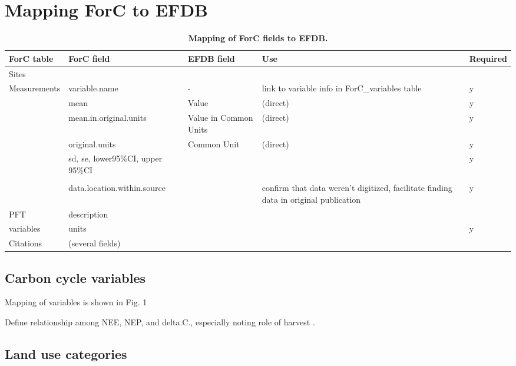 \documentclass[, manuscript]{copernicus}
\begin{document}
\section{Mapping ForC to EFDB}

\begin{table}

\caption{\label{tab:table_ForCfieldmapping}\textbf{Mapping of ForC fields to EFDB.}}
\centering
\begin{tabu} to 
\hline
\textbf{ForC table} & \textbf{ForC field} & \textbf{EFDB field} & \textbf{Use} & \textbf{Required}\\
\hline
Sites &  &  &  & \\
\hline
Measurements & variable.name & - & link to variable info in ForC\_variables table & y\\
\hline
 & mean & Value & (direct) & y\\
\hline
 & mean.in.original.units & Value in Common Units & (direct) & y\\
\hline
 & original.units & Common Unit & (direct) & y\\
\hline
 & sd, se, lower95\%CI, upper 95\%CI &  &  & y\\
\hline
 &  &  &  & \\
\hline
 & data.location.within.source &  & confirm that data weren't digitized, facilitate finding data in original publication & y\\
\hline
PFT & description &  &  & \\
\hline
variables & units &  &  & y\\
\hline
Citations & (several fields) &  &  & \\
\hline
\end{tabu}
\end{table}

\subsection{Carbon cycle variables}

Mapping of variables is shown in Fig. 1

Define relationship among NEE, NEP, and delta.C., especially noting role
of harvest \citep{chapin_reconciling_2006}.

\subsection{Land use categories}
\end{document}
